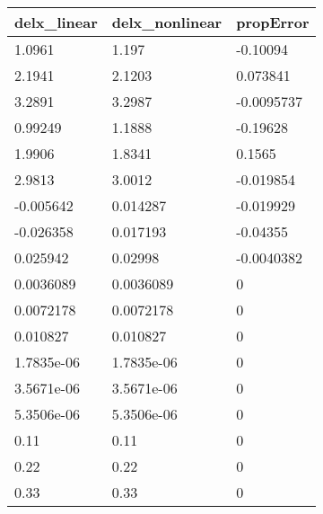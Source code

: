 \begin{tabular}{lll}
delx_linear & delx_nonlinear & propError \\ 
\hline 
1.0961 & 1.197 & -0.10094 \\ 
2.1941 & 2.1203 & 0.073841 \\ 
3.2891 & 3.2987 & -0.0095737 \\ 
0.99249 & 1.1888 & -0.19628 \\ 
1.9906 & 1.8341 & 0.1565 \\ 
2.9813 & 3.0012 & -0.019854 \\ 
-0.005642 & 0.014287 & -0.019929 \\ 
-0.026358 & 0.017193 & -0.04355 \\ 
0.025942 & 0.02998 & -0.0040382 \\ 
0.0036089 & 0.0036089 & 0 \\ 
0.0072178 & 0.0072178 & 0 \\ 
0.010827 & 0.010827 & 0 \\ 
1.7835e-06 & 1.7835e-06 & 0 \\ 
3.5671e-06 & 3.5671e-06 & 0 \\ 
5.3506e-06 & 5.3506e-06 & 0 \\ 
0.11 & 0.11 & 0 \\ 
0.22 & 0.22 & 0 \\ 
0.33 & 0.33 & 0 \\ 
\hline 
\end{tabular}